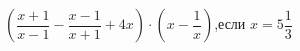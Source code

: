 \begin{ex}[type=simplify_calculate]
	\begin{condition}
		\( \left( \dfrac{x+1}{x-1}-\dfrac{x-1}{x+1}+4x \right)\cdot\left( x-\dfrac{1}{x} \right) \),\quad если \( x=5\dfrac{1}{3} \)
	\end{condition}
\end{ex}